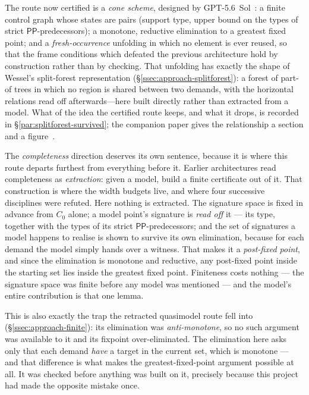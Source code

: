 \documentclass[11pt]{article}
\newcommand{\PP}{\mathsf{PP}}
\theoremstyle{plain}
\theoremstyle{definition}
\begin{document}
The route now certified is a \emph{cone scheme}, designed by
GPT-5.6~Sol~\cite{GPT56Sol}: a finite control graph whose states are pairs
(support type, upper bound on the types of strict $\PP$-predecessors); a
monotone, reductive elimination to a greatest fixed point; and a
\emph{fresh-occurrence} unfolding in which no element is ever reused, so that
the frame conditions which defeated the previous architecture hold by
construction rather than by checking. That unfolding has exactly the shape of
Wessel's split-forest representation (\S\ref{ssec:approach-splitforest}): a
forest of part-of trees in which no region is shared between two demands, with
the horizontal relations read off afterwards---here built directly rather than
extracted from a model. What of the idea the certified route keeps, and what
it drops, is recorded in \S\ref{par:splitforest-survived}; the companion paper
gives the relationship a section and a figure~\cite{PofreeFragmentPaper}.

The \emph{completeness} direction deserves its own sentence, because it is
where this route departs furthest from everything before it. Earlier
architectures read completeness as \emph{extraction}: given a model, build a
finite certificate out of it. That construction is where the width budgets
live, and where four successive disciplines were refuted. Here nothing is
extracted. The signature space is fixed in advance from $C_0$ alone; a model
point's signature is \emph{read off} it --- its type, together with the types of
its strict $\PP$-predecessors; and the set of signatures a model happens to
realise is shown to survive its own elimination, because for each demand the
model simply hands over a witness. That makes it a \emph{post-fixed point}, and
since the elimination is monotone and reductive, any post-fixed point inside the
starting set lies inside the greatest fixed point. Finiteness costs nothing ---
the signature space was finite before any model was mentioned --- and the
model's entire contribution is that one lemma.

This is also exactly the trap the retracted quasimodel route fell into
(\S\ref{ssec:approach-finite}): its elimination was \emph{anti-monotone}, so no
such argument was available to it and its fixpoint over-eliminated. The
elimination here asks only that each demand \emph{have} a target in the current
set, which is monotone --- and that difference is what makes the
greatest-fixed-point argument possible at all. It was checked before anything
was built on it, precisely because this project had made the opposite mistake
once.
\end{document}
